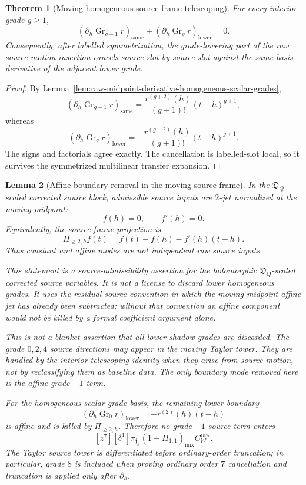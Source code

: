 \documentclass[11pt,a4paper]{amsart}
\theoremstyle{plain}
\newtheorem{theorem}{Theorem}[section]
\newtheorem{lemma}[theorem]{Lemma}
\theoremstyle{definition}
\begin{document}
\begin{theorem}[Moving homogeneous source-frame telescoping]
\label{thm:moving-homogeneous-source-frame-telescoping}
For every interior grade \(g\ge1\),
\[
\boxed{
(\partial_h\operatorname{Gr}_{g-1}r)_{\mathrm{same}}
+
(\partial_h\operatorname{Gr}_{g}r)_{\mathrm{lower}}
=0.
}
\]
Consequently, after labelled symmetrization, the grade-lowering part of
the raw source-motion insertion cancels source-slot by source-slot
against the same-basis derivative of the adjacent lower grade.
\end{theorem}

\begin{proof}
By Lemma~\ref{lem:raw-midpoint-derivative-homogeneous-scalar-grades},
\[
(\partial_h\operatorname{Gr}_{g-1}r)_{\mathrm{same}}
=
\frac{r^{(g+2)}(h)}{(g+1)!}(t-h)^{g+1},
\]
whereas
\[
(\partial_h\operatorname{Gr}_{g}r)_{\mathrm{lower}}
=
-\frac{r^{(g+2)}(h)}{(g+1)!}(t-h)^{g+1}.
\]
The signs and factorials agree exactly.  The cancellation is
labelled-slot local, so it survives the symmetrized multilinear transfer
expansion.
\end{proof}

\begin{lemma}[Affine boundary removal in the moving source frame]
\label{lem:affine-boundary-removal-moving-source-frame}
In the \(\mathfrak D_Q\)-scaled corrected source block, admissible source
inputs are \(2\)-jet normalized at the moving midpoint:
\[
f(h)=0,\qquad f'(h)=0.
\]
Equivalently, the source-frame projection is
\[
\Pi_{\ge2,h}f(t)=f(t)-f(h)-f'(h)(t-h).
\]
Thus constant and affine modes are not independent raw source inputs.

This statement is a source-admissibility assertion for the holomorphic
\(\mathfrak D_Q\)-scaled corrected source variables.  It is not a license to
discard lower homogeneous grades.  It uses the residual-source convention in
which the moving midpoint affine jet has already been subtracted; without
that convention an affine component would not be killed by a formal
coefficient argument alone.

This is not a blanket assertion that all lower-shadow grades are discarded.
The grade \(0,2,4\) source directions may appear in the moving Taylor tower.
They are handled by the interior telescoping identity when they arise from
source-motion, not by reclassifying them as baseline data.  The only
boundary mode removed here is the affine grade \(-1\) term.

For the homogeneous scalar-grade basis, the remaining lower boundary
\[
(\partial_h\operatorname{Gr}_{0}r)_{\mathrm{lower}}
=
-r^{(2)}(h)(t-h)
\]
is affine and is killed by \(\Pi_{\ge2,h}\).  Therefore no grade \(-1\)
source term enters
\[
[z^7][\delta^1]\pi_{\mathfrak f_h}
(1-\Pi_{1,1})_{\mathrm{mix}}C_{\mathcal W}^{\mathrm{raw}}.
\]
The Taylor source tower is differentiated before ordinary-order
truncation; in particular, grade \(8\) is included when proving ordinary
order \(7\) cancellation and truncation is applied only after
\(\partial_h\).
\end{lemma}
\end{document}
